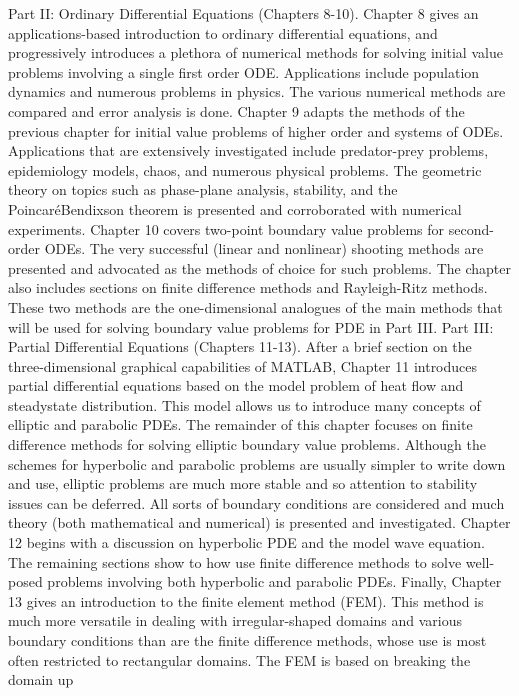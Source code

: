\documentclass{book}
\begin{document}
\noindent Part II: Ordinary Differential Equations (Chapters 8-10). Chapter 8 gives an
applications-based introduction to ordinary differential equations, and
progressively introduces a plethora of numerical methods for solving initial value
problems involving a single first order ODE. Applications include population
dynamics and numerous problems in physics. The various numerical methods are
compared and error analysis is done. Chapter 9 adapts the methods of the previous
chapter for initial value problems of higher order and systems of ODEs. Applications that are extensively investigated include predator-prey problems,
epidemiology models, chaos, and numerous physical problems. The geometric
theory on topics such as phase-plane analysis, stability, and the PoincaréBendixson theorem is presented and corroborated with numerical experiments.
Chapter 10 covers two-point boundary value problems for second-order ODEs.
The very successful (linear and nonlinear) shooting methods are presented and
advocated as the methods of choice for such problems. The chapter also includes
sections on finite difference methods and Rayleigh-Ritz methods. These two
methods are the one-dimensional analogues of the main methods that will be used
for solving boundary value problems for PDE in Part III.
Part III: Partial Differential Equations (Chapters 11-13). After a brief section on
the three-dimensional graphical capabilities of MATLAB, Chapter 11 introduces
partial differential equations based on the model problem of heat flow and steadystate distribution. This model allows us to introduce many concepts of elliptic and
parabolic PDEs. The remainder of this chapter focuses on finite difference
methods for solving elliptic boundary value problems. Although the schemes for
hyperbolic and parabolic problems are usually simpler to write down and use,
elliptic problems are much more stable and so attention to stability issues can be
deferred. All sorts of boundary conditions are considered and much theory (both
mathematical and numerical) is presented and investigated. Chapter 12 begins
with a discussion on hyperbolic PDE and the model wave equation. The
remaining sections show to how use finite difference methods to solve well-posed
problems involving both hyperbolic and parabolic PDEs. Finally, Chapter 13
gives an introduction to the finite element method (FEM). This method is much
more versatile in dealing with irregular-shaped domains and various boundary
conditions than are the finite difference methods, whose use is most often
restricted to rectangular domains. The FEM is based on breaking the domain up
\end{document}
